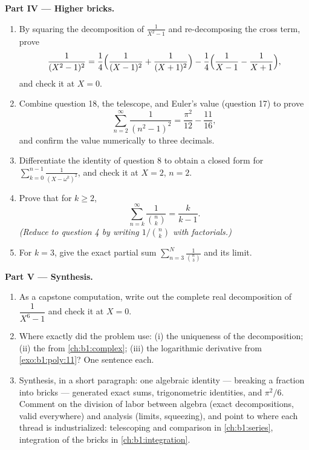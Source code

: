 \begin{problem}
\medskip
\noindent\textbf{Part IV --- Higher bricks.}
\begin{enumerate}[resume]
  \item By squaring the decomposition of $\frac1{X^2-1}$ and
        re-decomposing the cross term, prove
        \[
        \frac1{(X^2-1)^2}
        = \frac14\Bigl(\frac1{(X-1)^2} + \frac1{(X+1)^2}\Bigr)
        - \frac14\Bigl(\frac1{X-1} - \frac1{X+1}\Bigr),
        \]
        and check it at $X = 0$.
  \item Combine question 18, the telescope, and Euler's value
        (question 17) to prove
        \[
        \sum_{n=2}^{\infty}\frac1{(n^2-1)^2}
        = \frac{\pi^2}{12} - \frac{11}{16} ,
        \]
        and confirm the value numerically to three decimals.
  \item Differentiate the identity of question 8 to obtain a
        closed form for $\sum_{k=0}^{n-1}\frac1{(X -
        \omega^k)^2}$, and check it at $X = 2$, $n = 2$.
  \item Prove that for $k \geq 2$,
        \[
        \sum_{n=k}^{\infty}\frac{1}{\binom nk} = \frac{k}{k-1} .
        \]
        \emph{(Reduce to question 4 by writing $1/\binom nk$ with
        factorials.)}
  \item For $k = 3$, give the exact partial sum
        $\sum_{n=3}^{N}\frac1{\binom n3}$ and its limit.
\end{enumerate}

\medskip
\noindent\textbf{Part V --- Synthesis.}
\begin{enumerate}[resume]
  \item As a capstone computation, write out the complete real
        decomposition of $\dfrac1{X^6 - 1}$ and check it at $X =
        0$.
  \item Where exactly did the problem use: (i) the uniqueness of
        the decomposition; (ii) the  from
        \cref{ch:b1:complex}; (iii) the logarithmic derivative
        from \cref{exo:b1:poly:11}? One sentence each.
  \item Synthesis, in a short paragraph: one algebraic identity
        --- breaking a fraction into bricks --- generated exact
        sums, trigonometric identities, and $\pi^2/6$. Comment on
        the division of labor between algebra (exact
        decompositions, valid everywhere) and analysis (limits,
        squeezing), and point to where each thread is
        industrialized: telescoping and comparison in
        \cref{ch:b1:series}, integration of the bricks in
        \cref{ch:b1:integration}.
\end{enumerate}
\end{problem}
